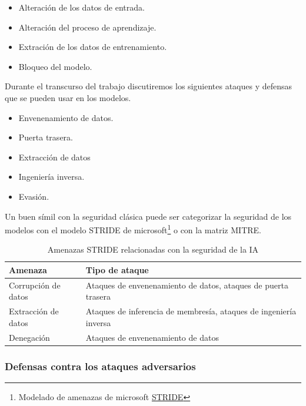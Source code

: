 \begin{itemize}
  \item Alteración de los datos de entrada.
  \item Alteración del proceso de aprendizaje.
  \item Extración de los datos de entrenamiento.
  \item Bloqueo del modelo.
\end{itemize}

Durante el transcurso del trabajo discutiremos los siguientes ataques y defensas que se pueden usar en los modelos.

\begin{itemize}
  \item Envenenamiento de datos.
  \item Puerta trasera.
  \item Extracción de datos
  \item Ingeniería inversa.
  \item Evasión.
\end{itemize}

Un buen símil con la seguridad clásica puede ser categorizar la seguridad de los modelos con el modelo \gls{STRIDE} de microsoft\footnote{Modelado de amenazas de microsoft \href{https://learn.microsoft.com/es-es/azure/security/develop/threat-modeling-tool-threats}{STRIDE}} o con la matriz \gls{MITRE}.

\begin{table}[H]
  \centering
  \small
  \def\arraystretch{1.5}
  \begin{tabular}{lp{10cm}}
    \toprule
    \textbf{Amenaza}    & \textbf{Tipo de ataque}                                           \\
    \midrule
    Corrupción de datos & Ataques de envenenamiento de datos, ataques de puerta trasera     \\
    Extracción de datos & Ataques de inferencia de membresía, ataques de ingeniería inversa \\
    Denegación          & Ataques de envenenamiento de datos                                \\
    \bottomrule
  \end{tabular}
  \caption{Amenazas STRIDE relacionadas con la seguridad de la IA}
  \label{tab.amenazas}
\end{table}

\subsubsection{Defensas contra los ataques adversarios}
